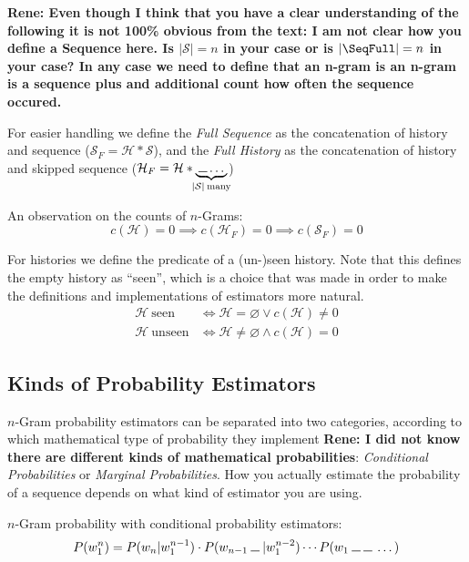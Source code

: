 \documentclass[11pt,a4paper]{article}
\newcommand{\Seq}{\mathcal{S}}
\newcommand{\Hist}{\mathcal{H}}
\newcommand{\SeqF}{\mathcal{S}_F}
\newcommand{\HistF}{\mathcal{H}_F}
\newcommand{\Skp}{\rule{7pt}{.5pt}}
\newcommand{\rp}[1]{\textbf{Rene: #1}}
\begin{document}
\rp{Even though I think that you have a clear understanding of the following it is not 100\% obvious from the text: I am not clear how you define a Sequence here. Is $|\Seq|=n$ in your case or is $|\SeqFull|=n$ in your case? In any case we need to define that an n-gram is an n-gram is a sequence plus and additional count how often the sequence occured.}

  For easier handling we define the \emph{Full Sequence} as the concatenation
  of history and sequence ($\SeqF = \Hist * \Seq$), and the \emph{Full History}
  as the concatenation of history and skipped sequence
  ($\HistF = \Hist * \underbrace{\: \Skp \dotso \:}_{\mathclap{|\Seq| \: \text{many}}}$)

  An observation on the counts of $n$-Grams:
  \begin{equation}
    c(\Hist) = 0 \implies c(\HistF) = 0 \implies c(\SeqF) = 0
  \end{equation}

  For histories we define the predicate of a (un-)seen history. Note that this
  defines the empty history as ``seen'', which is a choice that was made in
  order to make the definitions and implementations of estimators more natural.
  \begin{equation}
    \begin{aligned}
      \Hist \: \mathrm{seen} &\iff \Hist = \varnothing \lor c(\Hist) \neq 0 \\
      \Hist \: \mathrm{unseen} &\iff \Hist \neq \varnothing \land c(\Hist) = 0
    \end{aligned}
  \end{equation}

  \subsection{Kinds of Probability Estimators}

  $n$-Gram probability estimators can be separated into two categories,
  according to which mathematical type of probability they implement \rp{I did not know there are different kinds of mathematical probabilities}:
  \emph{Conditional Probabilities} or \emph{Marginal Probabilities}. How you
  actually estimate the probability of a sequence depends on what kind of
  estimator you are using.

  $n$-Gram probability with conditional probability estimators:
  \begin{equation}
    P(w_1^n) = P(w_n | w_1^{n-1}) \cdot P(w_{n-1} \: \Skp \: | w_1^{n-2}) \dotsm P(w_1 \: \Skp \: \Skp \: \dotso)
  \end{equation}
\end{document}
